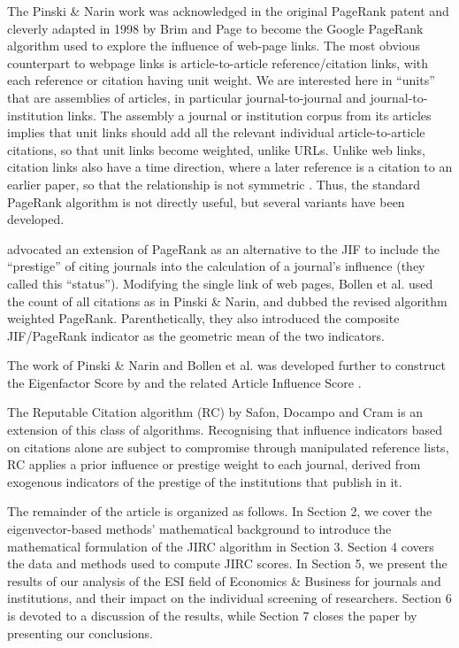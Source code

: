 \documentclass[10pt]{article}
\begin{document}
The Pinski \& Narin work was acknowledged in the original PageRank patent \citep{page1} and
cleverly adapted in 1998 by Brim and Page \citep{page} to become the Google PageRank algorithm
used to explore the influence of web-page links. The most obvious counterpart to webpage links is article-to-article reference/citation links, with each reference or citation
having unit weight. We are interested here in “units” that are assemblies of articles, in particular journal-to-journal and journal-to-institution links. The assembly a journal or institution corpus from its articles implies that unit links should add all the relevant individual article-to-article citations, so that unit links become weighted, unlike URLs. Unlike web links, citation links also have a time direction, where a later
reference is a citation to an earlier paper, so that the relationship is not symmetric \citep{wouters}. Thus, the standard PageRank algorithm is
not directly useful, but several variants have been developed.

\cite{bollen} advocated an extension of PageRank as an alternative to
the JIF to include the “prestige” of citing journals into the calculation of a journal’s
influence (they called this “status”). Modifying the single link of web pages, Bollen et al.
used the count of all citations as in Pinski \& Narin, and dubbed the revised algorithm
weighted PageRank. Parenthetically, they also introduced the composite JIF/PageRank
indicator as the geometric mean of the two indicators.

The work of Pinski \& Narin and Bollen et al. was developed further to construct the
Eigenfactor Score by \cite{bergstrom} and the related Article Influence Score \cite{franceschet}.

The Reputable Citation algorithm (RC) by Safon, Docampo and Cram \citep{safon2025}  is an extension of this class of algorithms. Recognising that influence indicators based on citations alone are subject to compromise
through manipulated reference lists, RC applies a prior influence or prestige weight
to each journal, derived from exogenous indicators of the prestige of the institutions
that publish in it.

The remainder of the article is organized as follows. In Section 2, we cover the eigenvector-based methods' mathematical background to introduce the mathematical formulation of the JIRC algorithm in Section 3. Section 4 covers the data and methods used to compute JIRC scores. In Section 5, we present the results of our analysis of the ESI field of Economics \& Business for journals and institutions, and their impact on the individual screening of researchers. Section 6 is devoted to a discussion of the results, while Section 7 closes the paper by presenting our conclusions.
\end{document}
